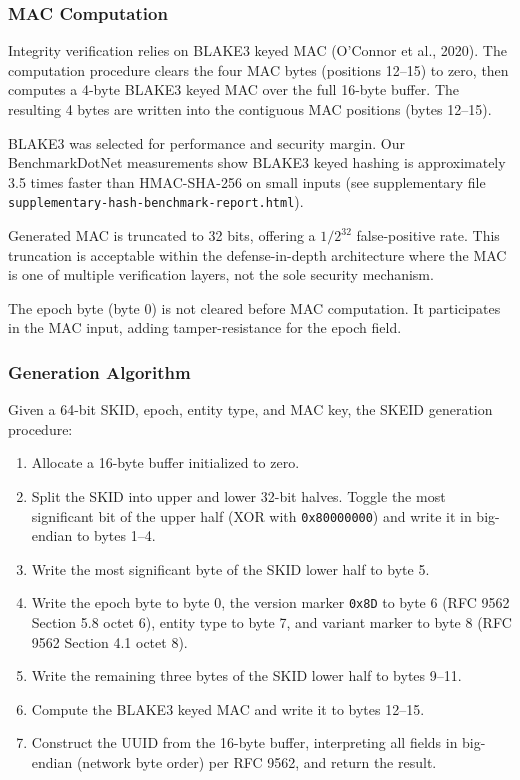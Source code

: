 \documentclass[fleqn,10pt,lineno]{wlpeerj}
\providecommand{\tightlist}{%
  \setlength{\itemsep}{0pt}\setlength{\parskip}{0pt}}
\begin{document}
\subsubsection{MAC Computation}\label{mac-computation}

Integrity verification relies on BLAKE3 keyed MAC (O'Connor et al.,
2020). The computation procedure clears the four MAC bytes (positions
12--15) to zero, then computes a 4-byte BLAKE3 keyed MAC over the full
16-byte buffer. The resulting 4 bytes are written into the contiguous
MAC positions (bytes 12--15).

BLAKE3 was selected for performance and security margin. Our
BenchmarkDotNet measurements show BLAKE3 keyed hashing is approximately
3.5 times faster than HMAC-SHA-256 on small inputs (see supplementary
file \texttt{supplementary-hash-benchmark-report.html}).

Generated MAC is truncated to 32 bits, offering a \(1/2^{32}\)
false-positive rate. This truncation is acceptable within the
defense-in-depth architecture where the MAC is one of multiple
verification layers, not the sole security mechanism.

The epoch byte (byte 0) is not cleared before MAC computation. It
participates in the MAC input, adding tamper-resistance for the epoch
field.

\newpage

\subsubsection{Generation Algorithm}\label{generation-algorithm-1}

Given a 64-bit SKID, epoch, entity type, and MAC key, the SKEID
generation procedure:

\begin{enumerate}
\def\labelenumi{\arabic{enumi}.}
\tightlist
\item
  Allocate a 16-byte buffer initialized to zero.
\item
  Split the SKID into upper and lower 32-bit halves. Toggle the most
  significant bit of the upper half (XOR with \texttt{0x80000000}) and
  write it in big-endian to bytes 1--4.
\item
  Write the most significant byte of the SKID lower half to byte 5.
\item
  Write the epoch byte to byte 0, the version marker \texttt{0x8D} to
  byte 6 (RFC 9562 Section 5.8 octet 6), entity type to byte 7, and
  variant marker to byte 8 (RFC 9562 Section 4.1 octet 8).
\item
  Write the remaining three bytes of the SKID lower half to bytes 9--11.
\item
  Compute the BLAKE3 keyed MAC and write it to bytes 12--15.
\item
  Construct the UUID from the 16-byte buffer, interpreting all fields in
  big-endian (network byte order) per RFC 9562, and return the result.
\end{enumerate}
\end{document}
